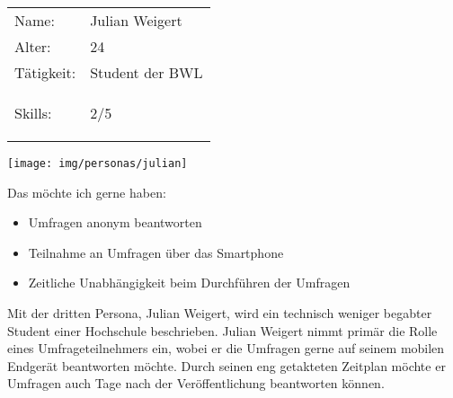 \newcommand{\weigert}{Julian Weigert\xspace} %
%
\newpage
\cvsect{\weigert}
\begin{minipage}[t]{0.5\textwidth}
	\vspace{-3.6cm}
	\renewcommand{\arraystretch}{1.5}
	\begin{tabular}{l l}
		Name: & \weigert \\
		Alter: & 24 \\
		Tätigkeit: & Student der BWL \\
		Skills: & 2/5 \hspace{-1cm} \begin{barchart}{5.0}
			\baritemNL{}{2}
		\end{barchart} \\
	\end{tabular}
\end{minipage}
\hfill
\begin{minipage}[t]{0.4\textwidth}
	\flushright
	\texttt{[image: img/personas/julian]}
\end{minipage}
\autocite{rf-unsplash-student}

Das möchte ich gerne haben:
\begin{itemize}
	\item Umfragen anonym beantworten
    \item Teilnahme an Umfragen über das Smartphone
    \item Zeitliche Unabhängigkeit beim Durchführen der Umfragen
\end{itemize}

Mit der dritten Persona, \weigert, wird ein technisch weniger begabter Student einer Hochschule beschrieben.
\weigert nimmt primär die Rolle eines Umfrageteilnehmers ein, wobei er die Umfragen gerne auf seinem mobilen Endgerät beantworten möchte.
Durch seinen eng getakteten Zeitplan möchte er Umfragen auch Tage nach der Veröffentlichung beantworten können.
